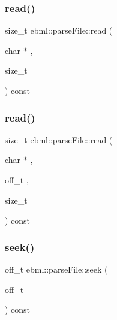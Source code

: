 \subsubsection{\texorpdfstring{read()}{read()}\hspace{0.1cm}{\footnotesize\ttfamily [2/3]}}
{\footnotesize\ttfamily size\+\_\+t ebml\+::parse\+File\+::read (\begin{DoxyParamCaption}\item[{char $\ast$}]{,  }\item[{size\+\_\+t}]{ }\end{DoxyParamCaption}) const}

\mbox{\label{classebml_1_1parseFile_adf66ffa2232190fd80d571234101168d}} 
\subsubsection{\texorpdfstring{read()}{read()}\hspace{0.1cm}{\footnotesize\ttfamily [3/3]}}
{\footnotesize\ttfamily size\+\_\+t ebml\+::parse\+File\+::read (\begin{DoxyParamCaption}\item[{char $\ast$}]{,  }\item[{off\+\_\+t}]{,  }\item[{size\+\_\+t}]{ }\end{DoxyParamCaption}) const}

\mbox{\label{classebml_1_1parseFile_afadebe20ce8552072386aa274063026c}} 
\subsubsection{\texorpdfstring{seek()}{seek()}}
{\footnotesize\ttfamily off\+\_\+t ebml\+::parse\+File\+::seek (\begin{DoxyParamCaption}\item[{off\+\_\+t}]{ }\end{DoxyParamCaption}) const}

\mbox{\label{classebml_1_1parseFile_a81ef81127bb4b467e56d5866ce834acd}} 
